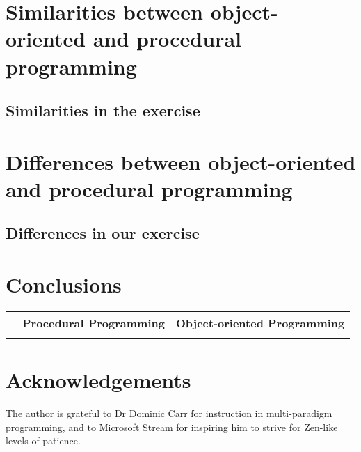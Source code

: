 \documentclass{article}
\begin{document}
\section{Similarities between object-oriented and procedural programming}
\subsection{Similarities in the exercise}

\section{Differences between object-oriented and procedural programming}
\subsection{Differences in our exercise}

\section{Conclusions}
\begin{table}
\begin{tabular}{c|c|c}
& Procedural Programming & Object-oriented Programming \\\hline
& & \\
\end{tabular}
\end{table}

\section*{Acknowledgements}
The author is grateful to Dr Dominic Carr for instruction in multi-paradigm programming, and to Microsoft Stream for inspiring him to strive for Zen-like levels of patience. 



\end{document}
